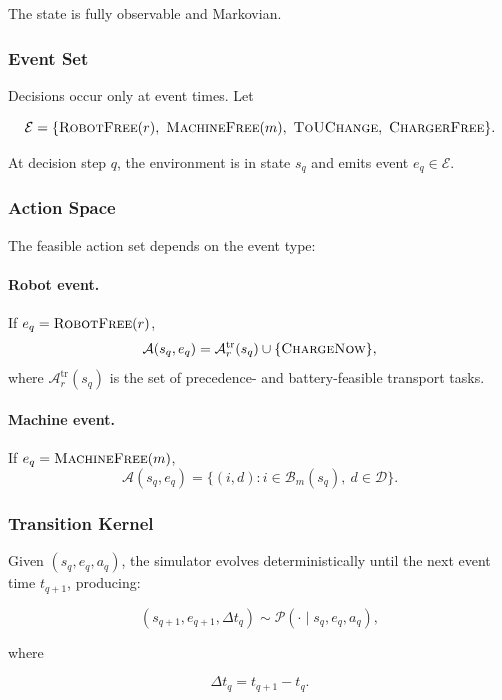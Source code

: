 \documentclass[preprint, 3p, review, 12pt]{elsarticle}
\begin{document}
The state is fully observable and Markovian.

\subsubsection{Event Set}

Decisions occur only at event times.
Let

\[
\mathcal{E} =
\{\textsc{RobotFree}(r),\ \textsc{MachineFree}(m),\ \textsc{ToUChange},\ \textsc{ChargerFree}\}.
\]

At decision step $q$, the environment is in state $s_q$
and emits event $e_q \in \mathcal{E}$.

\subsubsection{Action Space}

The feasible action set depends on the event type:

\paragraph{Robot event.}
If $e_q = \textsc{RobotFree}(r)$,
\[
\mathcal{A}(s_q,e_q)
=
\mathcal{A}^{\mathrm{tr}}_r(s_q)
\cup \{\textsc{ChargeNow}\},
\]
where $\mathcal{A}^{\mathrm{tr}}_r(s_q)$ is the set of precedence- and battery-feasible
transport tasks.

\paragraph{Machine event.}
If $e_q = \textsc{MachineFree}(m)$,
\[
\mathcal{A}(s_q,e_q)
=
\{(i,d): i \in \mathcal{B}_m(s_q),\ d \in \mathcal{D}\}.
\]

\subsubsection{Transition Kernel}

Given $(s_q,e_q,a_q)$,
the simulator evolves deterministically until the next event time $t_{q+1}$,
producing:

\[
(s_{q+1}, e_{q+1}, \Delta t_q)
\sim
\mathcal{P}(\cdot \mid s_q, e_q, a_q),
\]

where

\[
\Delta t_q = t_{q+1} - t_q.
\]
\end{document}
